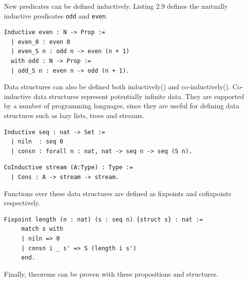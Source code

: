 \documentclass[12pt,twoside,notitlepage]{report}
\theoremstyle{plain}%
\theoremstyle{definition}
\theoremstyle{remark}
\begin{document}
New predicates can be defined inductively.  Listing 2.9 defines the mutually inductive predicates \lstinline[language={Coq}]|odd| and \lstinline[language={Coq}]|even|.


\begin{lstlisting}[language={Coq},caption={Coq Prop new predicate example}]
 Inductive even : N -> Prop :=
  | even_0 : even 0
  | even_S n : odd n -> even (n + 1)
  with odd : N -> Prop :=
  | odd_S n : even n -> odd (n + 1).
\end{lstlisting}


Data structures can also be defined both inductively() and co-inductively().\label{sec:coq_coind} Co-inductive data structures represent potentially infinite data.  They are supported by a number of programming languages, since they are useful for defining data structures such as lazy lists, trees and streams.


\begin{lstlisting}[language={Coq},caption={Coq inductive data structure example},label={lst:coqinddataex}]
 Inductive seq : nat -> Set :=
  | niln  : seq 0
  | consn : forall n : nat, nat -> seq n -> seq (S n).
\end{lstlisting}



\begin{lstlisting}[language={Coq},caption={Coq co-inductive data structure example},label={lst:coqcoinddataex}]
 CoInductive stream (A:Type) : Type :=
  | Cons : A -> stream -> stream.
\end{lstlisting}


Functions over these data structures are defined as fixpoints and cofixpoints respectively.


\begin{lstlisting}[language={Coq},caption={Coq fixpoint example}]
 Fixpoint length (n : nat) (s : seq n) {struct s} : nat := 
     match s with
     | niln => 0
     | consn i _ s' => S (length i s')
     end.
\end{lstlisting}


Finally, theorems can be proven with these propositions and structures.
\vspace{3mm}
\end{document}
